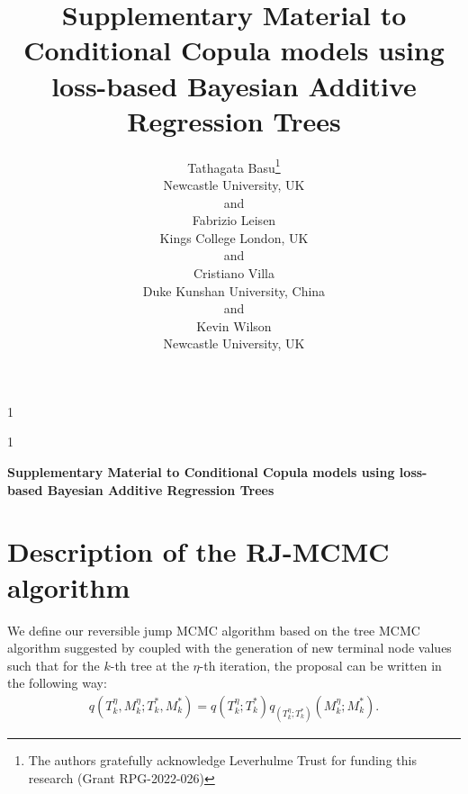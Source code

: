 \documentclass[
12pt]{article}
\newcommand{\anon}{1}
\begin{document}
\def\spacingset#1{\renewcommand{\baselinestretch}%
{#1}\small\normalsize} \spacingset{1}




\anon
{
  \title{\bf Supplementary Material to Conditional Copula models using loss-based Bayesian Additive Regression Trees}
  \author{Tathagata Basu\thanks{
    The authors gratefully acknowledge Leverhulme Trust for funding this research (Grant RPG-2022-026)}\hspace{.2cm}\\
    Newcastle University, UK\\
    and \\
    Fabrizio Leisen \\
    Kings College London, UK\\
    and \\
    Cristiano Villa \\
    Duke Kunshan University, China\\
    and \\
    Kevin Wilson \\
    Newcastle University, UK}
  \maketitle
} \fi

\anon
{
  \bigskip
  \bigskip
  \bigskip
  \begin{center}
    {\LARGE\bf Supplementary Material to Conditional Copula models using loss-based Bayesian Additive Regression Trees}
\end{center}
  \medskip
} \fi


\section{Description of the RJ-MCMC algorithm}\label{app:rj-mcmc}

We define our reversible jump MCMC algorithm based on the tree MCMC algorithm suggested by \cite{chipman98BCART} coupled with the generation of new terminal node values such that for the $k$-th tree at the $\eta$-th iteration, the proposal can be written in the following way:
\begin{align}\label{eq:prop}
	q\left(T_k^{\eta},M_k^{\eta};T_k^{\ast}, M_k^{\ast}\right) = q\left(T_k^{\eta};T_k^{\ast}\right) q_{\left(T_k^{\eta};T_k^{\ast}\right)}\left(M_k^{\eta};M_k^{\ast}\right).
\end{align}
\end{document}
